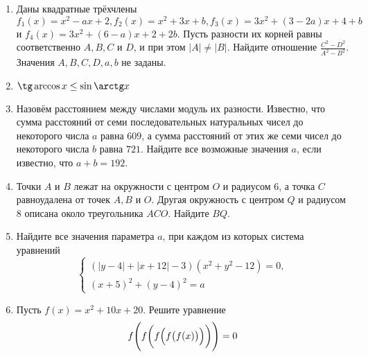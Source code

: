 \documentclass[a4paper, 12pt]{article}
\begin{document}
	\clearpage
	\pagestyle{empty}
	\begin{enumerate}
		\item Даны квадратные трёхчлены $f_1(x)=x^2-ax+2, f_2(x)=x^2+3x+b,f_3(x)=3x^2+(3-2a)x+4+b$ и $f_4(x)=3x^2+(6-a)x+2+2b$. Пусть разности их корней равны соответственно $A, B, C$ и $D$, и при этом $|A|\not=|B|$. Найдите отношение $\frac{C^2-D^2}{A^2-B^2}$. Значения $A, B, C, D, a, b$ не заданы.
		\item $\tg\arccos x\leq\sin\arctg x$
		\item Назовём расстоянием между числами модуль их разности. Известно, что сумма расстояний от
		семи последовательных натуральных чисел до некоторого числа $a$ равна $609$, а сумма расстояний от этих же семи чисел до некоторого числа $b$ равна $721$. Найдите все возможные значения
		$a$, если известно, что $a+b=192$.
		\item Точки $A$ и $B$ лежат на окружности с центром $O$ и радиусом $6$, а точка $C$ равноудалена от точек $A, B$ и $O$. Другая окружность с центром $Q$ и радиусом $8$ описана около треугольника $ACO$. Найдите $BQ$.
		\item Найдите все значения параметра $a$, при каждом из которых система уравнений
		\begin{equation*}
			\begin{cases}
				(|y-4|+|x+12|-3)(x^2+y^2-12)=0,\\
				(x+5)^2+(y-4)^2=a
			\end{cases}
		\end{equation*}
		\item Пусть $f(x)=x^2+10x+20$. Решите уравнение
		\[f\Biggl(f\biggl(f\Bigl(f\bigl(f(x)\bigr)\Bigr)\biggr)\Biggr)=0\]
	\end{enumerate}
\newpage
\end{document}
